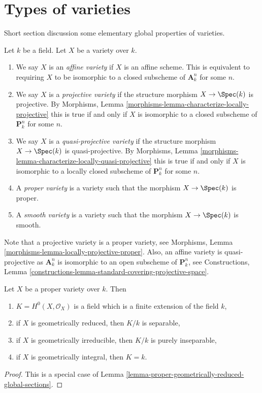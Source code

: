 \section{Types of varieties}
\label{section-types}

\noindent
Short section discussion some elementary global properties of varieties.

\begin{definition}
\label{definition-variety-type}
Let $k$ be a field. Let $X$ be a variety over $k$.
\begin{enumerate}
\item We say $X$ is an {\it affine variety} if $X$ is an affine scheme.
This is equivalent to requiring $X$ to be isomorphic to a closed
subscheme of $\mathbf{A}^n_k$ for some $n$.
\item We say $X$ is a {\it projective variety} if the
structure morphism $X \to \Spec(k)$ is projective. By
Morphisms, Lemma \ref{morphisms-lemma-characterize-locally-projective}
this is true if and only if $X$ is isomorphic to a closed
subscheme of $\mathbf{P}^n_k$ for some $n$.
\item We say $X$ is a {\it quasi-projective variety} if
the structure morphism $X \to \Spec(k)$ is quasi-projective. By
Morphisms, Lemma \ref{morphisms-lemma-characterize-locally-quasi-projective}
this is true if and only if $X$ is isomorphic to a
locally closed subscheme of $\mathbf{P}^n_k$ for some $n$.
\item A {\it proper variety} is a variety such that the
morphism $X \to \Spec(k)$ is proper.
\item A {\it smooth variety} is a variety such that the
morphism $X \to \Spec(k)$ is smooth.
\end{enumerate}
\end{definition}

\noindent
Note that a projective variety is a proper variety, see
Morphisms, Lemma \ref{morphisms-lemma-locally-projective-proper}.
Also, an affine variety is quasi-projective as $\mathbf{A}^n_k$
is isomorphic to an open subscheme of $\mathbf{P}^n_k$, see
Constructions,
Lemma \ref{constructions-lemma-standard-covering-projective-space}.

\begin{lemma}
\label{lemma-regular-functions-proper-variety}
Let $X$ be a proper variety over $k$. Then
\begin{enumerate}
\item $K = H^0(X, \mathcal{O}_X)$ is a field which is
a finite extension of the field $k$,
\item if $X$ is geometrically reduced, then $K/k$ is separable,
\item if $X$ is geometrically irreducible, then $K/k$
is purely inseparable,
\item if $X$ is geometrically integral, then $K = k$.
\end{enumerate}
\end{lemma}

\begin{proof}
This is a special case of
Lemma \ref{lemma-proper-geometrically-reduced-global-sections}.
\end{proof}




